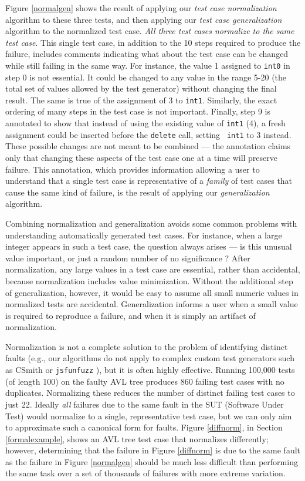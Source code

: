 Figure \ref{normalgen} shows the result of applying our \emph{test case
  normalization} algorithm to these three tests, and then applying our
\emph{test case generalization} algorithm to the normalized test case.
\emph{All three test cases normalize to the same test
case}.  This single test case, in addition to the 10 steps required to produce
the failure, includes comments indicating what about the test case can
be changed while still failing in the same way.  For instance, the
value 1 assigned to {\tt int0} in step 0 is not essential.  It could
be changed to any value in the range 5-20 (the total set of values
allowed by the test generator) without changing the final result.  The
same is true of the assignment of 3 to {\tt int1}.  Similarly, the
exact ordering of many steps in the test case is not important.  Finally,
step 9 is annotated to show that instead of using the existing value
of {\tt int1} (4), a fresh assignment could be inserted before the
{\tt delete} call, setting {\tt
  int1} to 3 instead.  These possible
changes are not meant to be combined --- the annotation claims only
that changing these aspects of the test case one at a time will
preserve failure.  This annotation,
which provides information
allowing a user to understand that a single test case is
representative of a \emph{family} of test cases that cause the same
kind of failure, is the result of applying our \emph{generalization}
\cite{SmartCheck} algorithm.

Combining normalization and generalization avoids some common problems
with understanding automatically generated test cases.  For instance,
when a large integer appears in such a test case, the question always
arises --- is this unusual value important, or just a random number of
no significance \cite{MakeMost}?  After normalization, any large
values in a test case are essential, rather than
accidental, because normalization includes value minimization.
Without the additional step of generalization, however, it would be
easy to assume all small numeric values in normalized
tests are accidental.  Generalization informs a user when a small
value is required to reproduce a failure, and when it is simply an
artifact of normalization.

Normalization is not a complete solution to the problem of identifying
distinct faults (e.g., our algorithms do not
apply to complex custom test generators such as CSmith \cite{csmith}
or {\tt jsfunfuzz} \cite{jsfunfuzz}), but it is often highly effective.  Running 100,000 tests (of length 100)
on the faulty AVL tree produces 860 failing test cases with no
duplicates.  Normalizing these reduces the number of distinct failing
test cases to just 22.  Ideally \emph{all} failures due to the same
fault in the SUT (Software Under Test) would normalize to a single,
representative test case, but we can only aim to approximate such a
canonical form for faults.  Figure \ref{diffnorm}, in Section
\ref{formalexample}, shows an AVL tree test case that normalizes
differently; however, determining that the failure in Figure
\ref{diffnorm} is due to the same fault
as the failure in Figure \ref{normalgen} should be much less difficult than
performing the same task over a set of thousands of failures with more
extreme variation.

